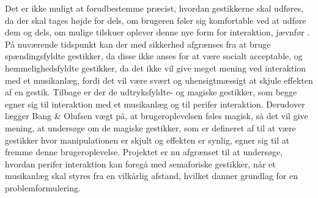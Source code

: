 Det er ikke muligt at forudbestemme præcist, hvordan gestikkerne skal udføres, da der skal tages højde for dels, om brugeren føler sig komfortable ved at udføre dem og dels, om mulige tilskuer oplever denne nye form for interaktion, jævnfør . På nuværende tidspunkt kan der med sikkerhed afgrænses fra at bruge spændingsfyldte gestikker, da disse ikke anses for at være socialt acceptable, \parencite[s. 277]{PDF:WouldYouDoThat} og hemmelighedsfyldte gestikker, da det ikke vil give meget mening ved interaktion med et musikanlæg, fordi det vil være svært og uhensigtmæssigt at skjule effekten af en gestik. Tilbage er der de udtryksfyldte- og magiske gestikker, som begge egner sig til interaktion med et musikanlæg og til perifer interaktion. Derudover lægger Bang $\&$ Olufsen vægt på, at brugeroplevelsen føles magisk, så det vil give mening, at undersøge om de magiske gestikker, som er defineret af \textcite[s. 276]{PDF:WouldYouDoThat} til at være gestikker hvor manipulationen er skjult og effekten er synlig, egner sig til at fremme denne brugeroplevelse. \blankline
%
Projektet er nu afgrænset til at undersøge, hvordan perifer interaktion kan foregå med semaforiske gestikker, når et musikanlæg skal styres fra en vilkårlig afstand, hvilket danner grundlag for en problemformulering.
